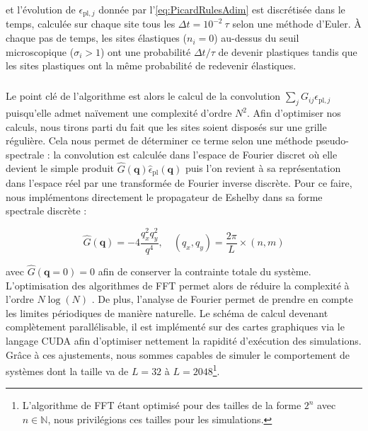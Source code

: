 \noindent et l'évolution de $\epsilon_{\text{pl},j}$ donnée par l'\autoref{eq:PicardRulesAdim} est discrétisée dans le temps, calculée sur chaque site tous les $\Delta t = 10^{-2}~\tau$ selon une méthode d'Euler. \`A chaque pas de temps, les sites élastiques ($n_i=0$) au-dessus du seuil microscopique ($\sigma_i >1$) ont une probabilité $\Delta t / \tau$ de devenir plastiques tandis que les sites plastiques ont la même probabilité de redevenir élastiques.

\subparagraph{}Le point clé de l'algorithme est alors le calcul de la convolution $\sum_{j}G_{ij}\epsilon_{\text{pl},j}$ puisqu'elle admet naïvement une complexité d'ordre $N^2$. Afin d'optimiser nos calculs, nous tirons parti du fait que les sites soient disposés sur une grille régulière. Cela nous permet de déterminer ce terme selon une méthode pseudo-spectrale : la convolution est calculée dans l'espace de Fourier discret où elle devient le simple produit $\hat{G}(\mathbf{q})\hat{\epsilon}_{\text{pl}}(\mathbf{q})$ puis l'on revient à sa représentation dans l'espace réel par une transformée de Fourier inverse discrète. Pour ce faire, nous implémentons directement le propagateur de Eshelby dans sa forme spectrale discrète \cite{picard_elastic_2004} :

\begin{equation}
	\hat{G}(\mathbf{q}) = -4\frac{q_x^2 q_y^2}{q^4}, \quad (q_x, q_y) = \frac{2\pi}{L} \times (n,m)
	\label{eq:eshelbydiscretfourier}
\end{equation}

\noindent avec $\hat{G}(\mathbf{q}=0) = 0$ afin de conserver la contrainte totale du système. L'optimisation des algorithmes de FFT permet alors de réduire la complexité à l'ordre $N\log(N)$ \cite{cooley_algorithm_1965}. De plus, l'analyse de Fourier permet de prendre en compte les limites périodiques de manière naturelle. Le schéma de calcul devenant complètement parallélisable, il est implémenté sur des cartes graphiques via le langage CUDA \cite{cuda} afin d'optimiser nettement la rapidité d'exécution des simulations. Grâce à ces ajustements, nous sommes capables de simuler le comportement de systèmes dont la taille va de $L=32$ à $L=2048$\footnote{L'algorithme de FFT étant optimisé pour des tailles de la forme $2^n$ avec $n\in\mathbb{N}$, nous privilégions ces tailles pour les simulations.}.

